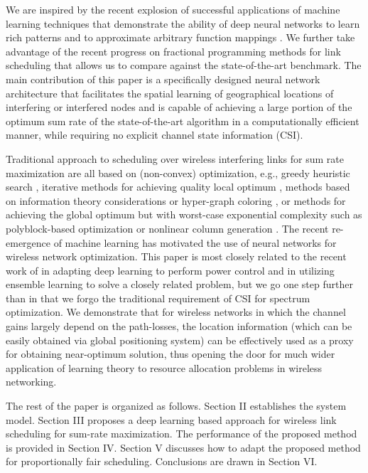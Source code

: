 \documentclass[journal,12pt,onecolumn,draftclsnofoot,]{IEEEtran}
\begin{document}
We are inspired by the recent explosion of successful applications of machine
learning techniques \cite{lecun_gradient,lecun_deep} that demonstrate the
ability of deep neural networks to learn rich patterns and to approximate
arbitrary function mappings \cite{hornik}.  We further take advantage of the
recent progress on fractional programming methods for link scheduling
\cite{shen_ISIT17,part1,part2} that allows us to compare against the
state-of-the-art benchmark. The main
contribution of this paper is a specifically designed neural network
architecture that facilitates the spatial learning of geographical locations of
interfering or interfered nodes and is capable of achieving a large portion of
the optimum sum rate of the state-of-the-art algorithm in a computationally
efficient manner, while requiring no explicit channel state information (CSI).

Traditional approach to scheduling over wireless interfering links
for sum rate maximization are all based on (non-convex) optimization, e.g.,
greedy heuristic search \cite{FlashLinQ}, iterative methods for achieving
quality local optimum \cite{shen_ISIT17, luo_TSP11}, methods based on
information theory considerations \cite{ITLinQ,ITLinQ+} or hyper-graph coloring
\cite{Guo_TCOM17,color}, or methods for achieving the global optimum but with
worst-case
exponential complexity such as polyblock-based optimization \cite{MAPEL} or
nonlinear column generation \cite{Johansson_TWC06}. The recent re-emergence of machine learning has motivated the use of neural networks for wireless network optimization. This paper
is most closely related to the recent work of \cite{hong_spawc, alejandro} in adapting
deep learning to perform power control and \cite{cong_ensemble} in utilizing
ensemble learning to solve a closely related problem, but we go one step further than
\cite{hong_spawc, cong_ensemble, alejandro} in that we forgo the traditional
requirement of CSI for spectrum optimization. We demonstrate that for wireless networks in which the channel gains largely depend on the
path-losses, the location information (which can be easily obtained via global
positioning system) can be effectively used as a proxy for obtaining
near-optimum solution, thus opening the door for much wider application of
learning theory to resource allocation problems in wireless networking.

The rest of the paper is organized as follows. Section II establishes the
system model. Section III proposes a deep learning based approach
for wireless link scheduling for sum-rate maximization.
The performance of the proposed method is provided in Section IV. Section V
discusses how to adapt the proposed method for proportionally fair scheduling.
Conclusions are drawn in Section VI.
\end{document}
